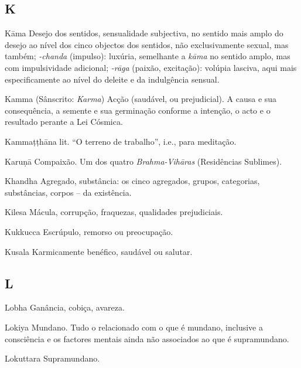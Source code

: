 \subsection{K}

\begin{glossarydescription}

\item[Kāma] Desejo dos sentidos, sensualidade subjectiva, no sentido mais
amplo do desejo ao nível dos cinco objectos dos sentidos, não exclusivamente
sexual, mas também; \emph{-chanda} (impulso): luxúria, semelhante a
\emph{kāma} no sentido amplo, mas com impulsividade adicional; \emph{-rāga}
(paixão, excitação): volúpia lasciva, aqui mais especificamente ao nível do
deleite e da indulgência sensual.

\item[Kamma] (Sânscrito: \emph{Karma}) Acção (saudável, ou prejudicial). A causa
e sua consequência, a semente e sua germinação conforme a intenção, o acto e o
resultado perante a Lei Cósmica.

\item[Kammaṭṭhāna] lit. ``O terreno de trabalho'', i.e., para meditação.

\item[Karuṇā] Compaixão. Um dos quatro \emph{Brahma-Vihāras} (Residências Sublimes).

\item[Khandha] Agregado, substância: os cinco agregados, grupos, categorias,
substâncias, corpos -- da existência.

\item[Kilesa] Mácula, corrupção, fraquezas, qualidades prejudiciais.

\item[Kukkucca] Escrúpulo, remorso ou preocupação.

\item[Kusala] Karmicamente benéfico, saudável ou salutar.

\end{glossarydescription}

\subsection{L}

\begin{glossarydescription}

\item[Lobha] Ganância, cobiça, avareza.

\item[Lokiya] Mundano. Tudo o relacionado com o que é mundano, inclusive a
consciência e os factores mentais ainda não associados ao que é supramundano.

\item[Lokuttara] Supramundano.

\end{glossarydescription}

